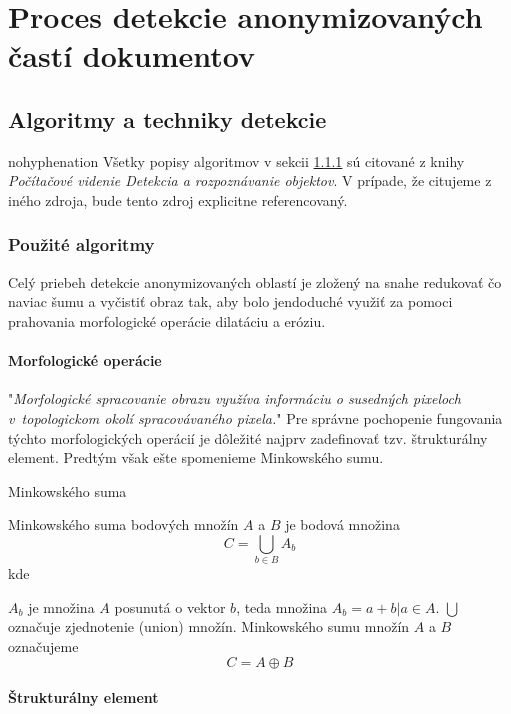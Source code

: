 \chapter{Proces detekcie anonymizovaných častí dokumentov}
\label{chap:FourthChapter}

\section{Algoritmy a techniky detekcie}
\begin{hyphenrules}{nohyphenation}
Všetky popisy algoritmov v sekcii \ref{chap:4.1.1} sú citované z knihy \textit{Počítačové videnie Detekcia a rozpoznávanie objektov}\cite{sikudova2014videnie}. V prípade, že citujeme z iného zdroja, bude tento zdroj explicitne referencovaný.
\subsection{Použité algoritmy}\label{chap:4.1.1}
Celý priebeh detekcie anonymizovaných oblastí je zložený na snahe redukovať čo naviac šumu a vyčistiť obraz tak, aby bolo jendoduché využiť za pomoci prahovania morfologické operácie dilatáciu a eróziu. 
\newline
\subsubsection{Morfologické operácie}
"\textit{Morfologické spracovanie obrazu využíva informáciu o susedných pixeloch v~topologickom okolí spracovávaného pixela.}"
Pre správne pochopenie fungovania týchto morfologických operácií je dôležité najprv zadefinovať tzv. štrukturálny element. Predtým však ešte spomenieme Minkowského sumu.

\begin{defn}{Minkowského suma}

    Minkowského suma bodových množín $A$ a $B$ je bodová množina
    \[C = \bigcup_{b\in B}A_b\]
kde

$A_b$ je množina $A$ posunutá o vektor $b$, teda množina $A_b = a + b | a \in A$. $\bigcup$ označuje zjednotenie (union) množín.
Minkowského sumu množín $A$ a $B$ označujeme
\[C = A \oplus B\]
\end{defn}
\subsubsection{Štrukturálny element}


\end{hyphenrules}
